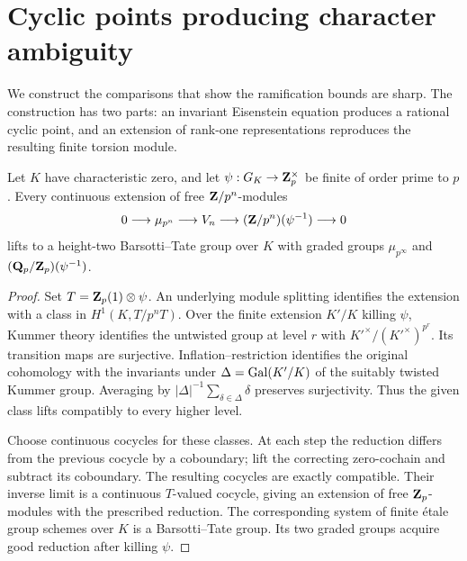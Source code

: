 \section{Cyclic points producing character ambiguity}\label{sec:ambiguity}
We construct the comparisons that show the ramification bounds are sharp. The construction has two parts: an invariant Eisenstein equation produces a rational cyclic point, and an extension of rank-one representations reproduces the resulting finite torsion module.

\begin{lemma}\label{lem:extension-lift}
Let $K$ have characteristic zero, and let $\psi:G_K\to\mathbf Z_p^\times$ be finite of order prime to $p$. Every continuous extension of free $\mathbf Z/p^n$-modules
\[
 0\longrightarrow\mu_{p^n}\longrightarrow V_n
       \longrightarrow(\mathbf Z/p^n)(\psi^{-1})\longrightarrow0
\]
lifts to a height-two Barsotti--Tate group over $K$ with graded groups $\mu_{p^\infty}$ and $(\mathbf Q_p/\mathbf Z_p)(\psi^{-1})$.
\end{lemma}
\begin{proof}
Set $T=\mathbf Z_p(1)\otimes\psi$. An underlying module splitting identifies the extension with a class in $H^1(K,T/p^nT)$. Over the finite extension $K'/K$ killing $\psi$, Kummer theory identifies the untwisted group at level $r$ with $K'^\times/(K'^\times)^{p^r}$. Its transition maps are surjective. Inflation--restriction identifies the original cohomology with the invariants under $\Delta=\operatorname{Gal}(K'/K)$ of the suitably twisted Kummer group. Averaging by $|\Delta|^{-1}\sum_{\delta\in\Delta}\delta$ preserves surjectivity. Thus the given class lifts compatibly to every higher level.

Choose continuous cocycles for these classes. At each step the reduction differs from the previous cocycle by a coboundary; lift the correcting zero-cochain and subtract its coboundary. The resulting cocycles are exactly compatible. Their inverse limit is a continuous $T$-valued cocycle, giving an extension of free $\mathbf Z_p$-modules with the prescribed reduction. The corresponding system of finite \'etale group schemes over $K$ is a Barsotti--Tate group. Its two graded groups acquire good reduction after killing $\psi$.
\end{proof}

